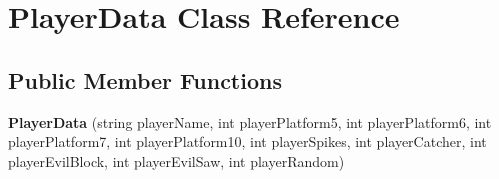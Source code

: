 \hypertarget{class_player_data}{}\section{Player\+Data Class Reference}
\label{class_player_data}
\subsection*{Public Member Functions}
\begin{DoxyCompactItemize}
\item 
\mbox{\label{class_player_data_a3874f7289a2aad6349bbb8e905f82cc6}} 
{\bfseries Player\+Data} (string player\+Name, int player\+Platform5, int player\+Platform6, int player\+Platform7, int player\+Platform10, int player\+Spikes, int player\+Catcher, int player\+Evil\+Block, int player\+Evil\+Saw, int player\+Random)
\end{DoxyCompactItemize}
